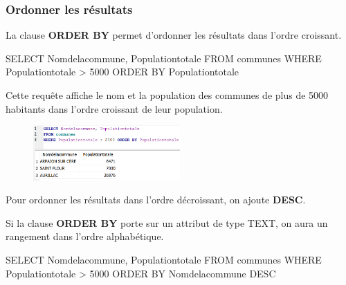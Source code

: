\documentclass[
  letterpaper,
  DIV=11,
  numbers=noendperiod]{scrartcl}
\newenvironment{Shaded}{\begin{snugshade}}{\end{snugshade}}
\newcommand{\DecValTok}[1]{\textcolor[rgb]{0.68,0.00,0.00}{#1}}
\newcommand{\KeywordTok}[1]{\textcolor[rgb]{0.00,0.23,0.31}{#1}}
\newcommand{\NormalTok}[1]{\textcolor[rgb]{0.00,0.23,0.31}{#1}}
\newcommand{\OperatorTok}[1]{\textcolor[rgb]{0.37,0.37,0.37}{#1}}
\begin{document}
\hypertarget{ordonner-les-ruxe9sultats}{%
\subsubsection{Ordonner les résultats}\label{ordonner-les-ruxe9sultats}}

La clause \textbf{ORDER BY} permet d'ordonner les résultats dans l'ordre
croissant.

\begin{Shaded}
\begin{Highlighting}[]
\KeywordTok{SELECT}\NormalTok{ Nomdelacommune, Populationtotale}
\KeywordTok{FROM}\NormalTok{ communes}
\KeywordTok{WHERE}\NormalTok{ Populationtotale }\OperatorTok{\textgreater{}} \DecValTok{5000} \KeywordTok{ORDER} \KeywordTok{BY}\NormalTok{ Populationtotale}
\end{Highlighting}
\end{Shaded}

Cette requête affiche le nom et la population des communes de plus de
5000 habitants dans l'ordre croissant de leur population.

\begin{figure}

{\centering \includegraphics[width=0.5\textwidth,height=\textheight]{SQL5.png}

}

\end{figure}

Pour ordonner les résultats dans l'ordre décroissant, on ajoute
\textbf{DESC}.

Si la clause \textbf{ORDER BY} porte sur un attribut de type TEXT, on
aura un rangement dans l'ordre alphabétique.

\begin{Shaded}
\begin{Highlighting}[]
\KeywordTok{SELECT}\NormalTok{ Nomdelacommune, Populationtotale}
\KeywordTok{FROM}\NormalTok{ communes}
\KeywordTok{WHERE}\NormalTok{ Populationtotale }\OperatorTok{\textgreater{}} \DecValTok{5000} \KeywordTok{ORDER} \KeywordTok{BY}\NormalTok{ Nomdelacommune }\KeywordTok{DESC}
\end{Highlighting}
\end{Shaded}
\end{document}

